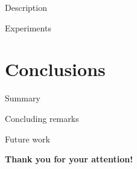 \documentclass{beamer}
\begin{document}
\begin{frame}{Description}
\end{frame}

\begin{frame}{Experiments}
\end{frame}


\section{Conclusions}

\begin{frame}{Summary}
\end{frame}

\begin{frame}{Concluding remarks}
\end{frame}

\begin{frame}{Future work}
\end{frame}

\begin{frame}{}

\begin{center}
\Large{\textbf{Thank you for your attention!}}
\end{center}

\end{frame}
\end{document}
